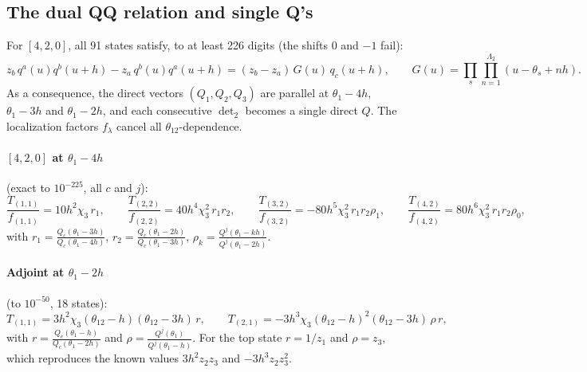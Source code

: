 \documentclass[11pt]{article}
\newcommand{\tw}{\theta_{12}}
\begin{document}
\subsection{The dual QQ relation and single Q's}
For $[4,2,0]$, all 91 states satisfy, to at least 226 digits (the shifts $0$ and $-1$ fail):
\[
\boxed{z_b\,q^a(u)q^b(u+h)-z_a\,q^b(u)q^a(u+h)=(z_b-z_a)\,G(u)\,q_c(u+h),\qquad G(u)=\prod_s\prod_{n=1}^{\Lambda_2}(u-\theta_s+nh).}
\]
As a consequence, the direct vectors $(Q_1,Q_2,Q_3)$ are parallel at $\theta_1-4h$, $\theta_1-3h$ and $\theta_1-2h$, and each consecutive $\det_2$ becomes a single direct $Q$. The localization factors $f_\lambda$ cancel all $\tw$-dependence.

\paragraph{$[4,2,0]$ at $\theta_1-4h$} (exact to $10^{-225}$, all $c$ and $j$):
\[
\frac{T_{(1,1)}}{f_{(1,1)}}=10h^2\chi_3\,r_1,\qquad
\frac{T_{(2,2)}}{f_{(2,2)}}=40h^4\chi_3^2\,r_1r_2,\qquad
\frac{T_{(3,2)}}{f_{(3,2)}}=-80h^5\chi_3^2\,r_1r_2\rho_1,\qquad
\frac{T_{(4,2)}}{f_{(4,2)}}=80h^6\chi_3^2\,r_1r_2\rho_0,
\]
with $r_1=\frac{Q_c(\theta_1-3h)}{Q_c(\theta_1-4h)}$, $r_2=\frac{Q_c(\theta_1-2h)}{Q_c(\theta_1-3h)}$, $\rho_k=\frac{Q^j(\theta_1-kh)}{Q^j(\theta_1-2h)}$.

\paragraph{Adjoint at $\theta_1-2h$} (to $10^{-50}$, 18 states):
\[
T_{(1,1)}=3h^2\chi_3(\tw-h)(\tw-3h)\,r,\qquad
T_{(2,1)}=-3h^3\chi_3(\tw-h)^2(\tw-3h)\,\rho\,r,
\]
with $r=\frac{Q_c(\theta_1-h)}{Q_c(\theta_1-2h)}$ and $\rho=\frac{Q^j(\theta_1)}{Q^j(\theta_1-h)}$. For the top state $r=1/z_1$ and $\rho=z_3$, which reproduces the known values $3h^2z_2z_3$ and $-3h^3z_2z_3^2$.

\end{document}
